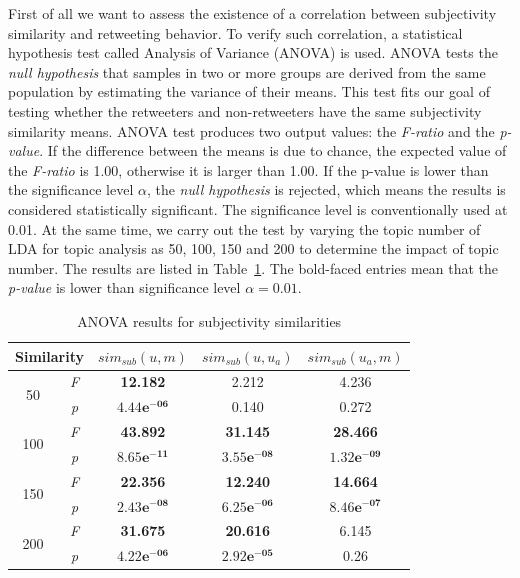 \documentclass{acm_proc_article-sp}
\begin{document}
First of all we want to assess the existence of a correlation between subjectivity similarity and retweeting behavior. 
To verify such correlation, a statistical hypothesis test called Analysis of Variance (ANOVA) \cite{fisher1970statistical} is used. 
ANOVA tests the \textit{null hypothesis} that samples in two or more groups are derived from the same population by estimating the variance of their means. 
This test fits our goal of testing whether the retweeters and non-retweeters have the same subjectivity similarity means. 
ANOVA test produces two output values: the \textit{F-ratio} and the \textit{p-value}. 
If the difference between the means is due to chance, the expected value of the \textit{F-ratio} is 1.00, otherwise it is larger than 1.00. 
If the p-value is lower than the significance level $ \alpha $, the \textit{null hypothesis} is rejected, which means the results is considered statistically significant. 
The significance level is conventionally used at 0.01.
At the same time, we carry out the test by varying the topic number of LDA for topic analysis as 50, 100, 150 and 200 to determine the impact of topic number. 
The results are listed in Table~\ref{tab2}. The bold-faced entries mean that the \textit{p-value} is lower than significance level $ \alpha = 0.01 $.
\begin{table}[htb]
\scriptsize
\centering
\caption{ANOVA results for subjectivity similarities}
\label{tab2}
\begin{tabular}{|c|c|c|c|c|}
\hline
\multicolumn{2}{|c|}{Similarity}& $ sim_{sub} \left( u,m \right) $ & $ sim_{sub}\left( u,u_{a} \right)  $ & $ sim_{sub}\left( u_{a},m \right)  $\\
\hline
\multirow{2}{*}{50} & \textit{F} & \textbf{12.182} & 2.212 & 4.236 \\
\cline{2-5}
  & \textit{p} &  $\mathbf{4.44e^{-06}}$  & 0.140 & 0.272\\
\hline
\multirow{2}{*}{100} & \textit{F} & \textbf{43.892} & \textbf{31.145} & \textbf{28.466} \\
\cline{2-5}
  & \textit{p} &  $\mathbf{8.65e^{-11}}$  & $\mathbf{3.55e^{-08}}$ & $\mathbf{1.32e^{-09}}$\\
\hline
\multirow{2}{*}{150} & \textit{F} & \textbf{22.356} & \textbf{12.240} & \textbf{14.664} \\
\cline{2-5}
  & \textit{p} &  $\mathbf{2.43e^{-08}}$  & $\mathbf{6.25e^{-06}}$ & $\mathbf{8.46e^{-07}}$\\
\hline
\multirow{2}{*}{200} & \textit{F} & \textbf{31.675} & \textbf{20.616} & 6.145\\
\cline{2-5}
  & \textit{p} &  $\mathbf{4.22e^{-06}}$  & $\mathbf{2.92e^{-05}}$ & 0.26\\
\hline
\end{tabular}
\end{table}
\end{document}
